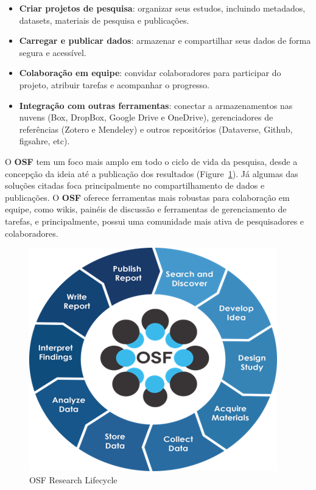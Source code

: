 \documentclass[
  a4paper,
]{article}
\providecommand{\tightlist}{%
  \setlength{\itemsep}{0pt}\setlength{\parskip}{0pt}}\usepackage{longtable,booktabs,array}
\begin{document}
\begin{itemize}
\tightlist
\item
  \textbf{Criar projetos de pesquisa}: organizar seus estudos, incluindo
  metadados, datasets, materiais de pesquisa e publicações.
\item
  \textbf{Carregar e publicar dados}: armazenar e compartilhar seus
  dados de forma segura e acessível.
\item
  \textbf{Colaboração em equipe}: convidar colaboradores para participar
  do projeto, atribuir tarefas e acompanhar o progresso.
\item
  \textbf{Integração com outras ferramentas}: conectar a armazenamentos
  nas nuvens (Box, DropBox, Google Drive e OneDrive), gerenciadores de
  referências (Zotero e Mendeley) e outros repositórios (Dataverse,
  Github, figsahre, etc).
\end{itemize}

O \textbf{OSF} tem um foco mais amplo em todo o ciclo de vida da
pesquisa, desde a concepção da ideia até a publicação dos resultados
(Figure~\ref{fig-osf-researchcycle}). Já algumas das soluções citadas
foca principalmente no compartilhamento de dados e publicações. O
\textbf{OSF} oferece ferramentas mais robustas para colaboração em
equipe, como wikis, painéis de discussão e ferramentas de gerenciamento
de tarefas, e principalmente, possui uma comunidade mais ativa de
pesquisadores e colaboradores.

\begin{figure}

\includegraphics{img/osf-researchcycle.png}

\caption{\label{fig-osf-researchcycle}OSF Research Lifecycle}

\end{figure}%
\end{document}
